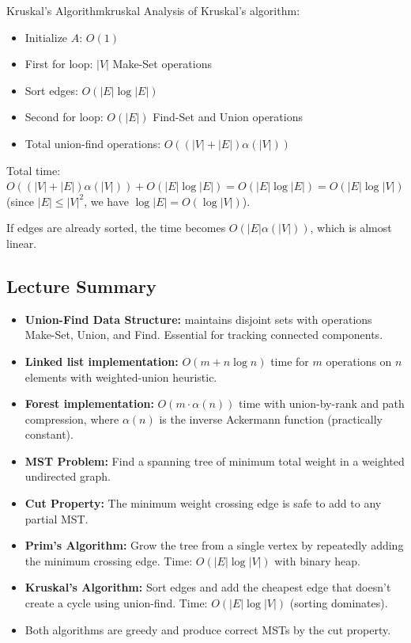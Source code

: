 \begin{complexity}{Kruskal's Algorithm}{kruskal}
Analysis of Kruskal's algorithm:
\begin{itemize}[noitemsep]
  \item Initialize $A$: $O(1)$
  \item First for loop: $|V|$ Make-Set operations
  \item Sort edges: $O(|E| \log |E|)$
  \item Second for loop: $O(|E|)$ Find-Set and Union operations
  \item Total union-find operations: $O((|V| + |E|) \alpha(|V|))$
\end{itemize}
Total time: $O((|V| + |E|) \alpha(|V|)) + O(|E| \log |E|) = O(|E| \log |E|) = O(|E| \log |V|)$ 
(since $|E| \le |V|^2$, we have $\log |E| = O(\log |V|)$).

If edges are already sorted, the time becomes $O(|E| \alpha(|V|))$, which is almost linear.
\end{complexity}

\subsection{Lecture Summary}

\begin{tcolorbox}[colback=lightblue, colframe=keyblue, fonttitle=\bfseries,
                  title={Key Points}]
\begin{itemize}[noitemsep]
  \item \textbf{Union-Find Data Structure:} maintains disjoint sets with operations Make-Set, 
        Union, and Find. Essential for tracking connected components.
  \item \textbf{Linked list implementation:} $O(m + n \log n)$ time for $m$ operations on 
        $n$ elements with weighted-union heuristic.
  \item \textbf{Forest implementation:} $O(m \cdot \alpha(n))$ time with union-by-rank and 
        path compression, where $\alpha(n)$ is the inverse Ackermann function (practically constant).
  \item \textbf{MST Problem:} Find a spanning tree of minimum total weight in a weighted 
        undirected graph.
  \item \textbf{Cut Property:} The minimum weight crossing edge is safe to add to any partial MST.
  \item \textbf{Prim's Algorithm:} Grow the tree from a single vertex by repeatedly adding 
        the minimum crossing edge. Time: $O(|E| \log |V|)$ with binary heap.
  \item \textbf{Kruskal's Algorithm:} Sort edges and add the cheapest edge that doesn't create 
        a cycle using union-find. Time: $O(|E| \log |V|)$ (sorting dominates).
  \item Both algorithms are greedy and produce correct MSTs by the cut property.
\end{itemize}
\end{tcolorbox}